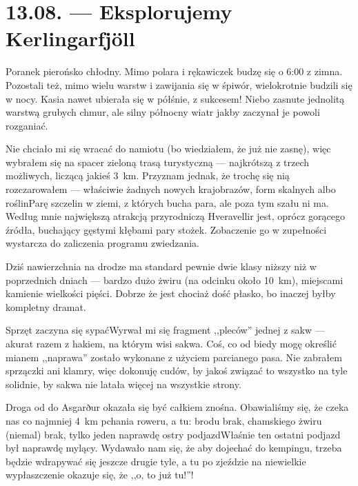 \chapter*{13.08. --- Eksplorujemy Kerlingarfjöll}

Poranek pierońsko chłodny. Mimo polara i rękawiczek budzę się o 6:00 z zimna. Pozostali też, mimo wielu warstw i zawijania się w śpiwór, wielokrotnie budzili się w nocy. Kasia nawet ubierała się w półśnie, z sukcesem! Niebo zasnute jednolitą warstwą grubych chmur, ale silny północny wiatr jakby zaczynał je powoli rozganiać.

Nie chciało mi się wracać do namiotu (bo wiedziałem, że już nie zasnę), więc wybrałem się na spacer zieloną trasą turystyczną --- najkrótszą z trzech możliwych, liczącą jakieś 3~km. Przyznam jednak, że trochę się nią rozczarowałem --- właściwie żadnych nowych krajobrazów, form skalnych albo roślin\textellipsis Parę szczelin w ziemi, z których bucha para, ale poza tym szału ni ma. Według mnie największą atrakcją przyrodniczą Hveravellir jest, oprócz gorącego źródła, buchający gęstymi kłębami pary stożek. Zobaczenie go w zupełności wystarcza do zaliczenia programu zwiedzania.


Dziś nawierzchnia na drodze ma standard pewnie dwie klasy niższy niż w poprzednich dniach --- bardzo dużo żwiru (na odcinku około 10~km), miejscami kamienie wielkości pięści. Dobrze że jest chociaż dość płasko, bo inaczej byłby kompletny dramat.


Sprzęt zaczyna się sypać\textellipsis Wyrwał mi się fragment ,,pleców'' jednej z sakw --- akurat razem z hakiem, na którym wisi sakwa. Coś, co od biedy mogę określić mianem ,,naprawa'' zostało wykonane z użyciem parcianego pasa. Nie zabrałem sprzączki ani klamry, więc dokonuję cudów, by jakoś związać to wszystko na tyle solidnie, by sakwa nie latała więcej na wszystkie strony.

Droga od  do Asgarður okazała się być całkiem znośna. Obawialiśmy się, że czeka nas co najmniej 4~km pchania roweru, a tu: brodu brak, chamskiego żwiru (niemal) brak, tylko jeden naprawdę ostry podjazd\textellipsis Właśnie ten ostatni podjazd był naprawdę mylący. Wydawało nam się, że aby dojechać do kempingu, trzeba będzie wdrapywać się jeszcze drugie tyle, a tu po zjeździe na niewielkie wypłaszczenie okazuje się, że ,,o, to już tu!''!

